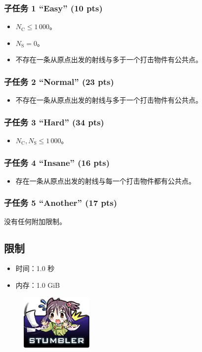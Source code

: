 \documentclass[UTF8, 11pt, a4paper]{article}
\begin{document}
\subsubsection*{子任务 1 “Easy” (10 pts)}
\begin{itemize}
    \item $N_\mathrm{C} \leq 1\,000$。
    \item $N_\mathrm{S} = 0$。
    \item 不存在一条从原点出发的射线与多于一个打击物件有公共点。
\end{itemize}
\subsubsection*{子任务 2 “Normal” (23 pts)}
\begin{itemize}
    \item 不存在一条从原点出发的射线与多于一个打击物件有公共点。
\end{itemize}
\subsubsection*{子任务 3 “Hard” (34 pts)}
\begin{itemize}
    \item $N_\mathrm{C}, N_\mathrm{S} \leq 1\,000$。
\end{itemize}
\subsubsection*{子任务 4 “Insane” (16 pts)}
\begin{itemize}
    \item 存在一条从原点出发的射线与每一个打击物件都有公共点。
\end{itemize}
\subsubsection*{子任务 5 “Another” (17 pts)}
    没有任何附加限制。

\subsection*{限制}
\begin{itemize}
\item 时间：1.0 秒
\item 内存：1.0 GiB
\end{itemize}

\begin{figure}[h]\centering
\includegraphics[scale=0.55]{stumbler.png}
\end{figure}
\end{document}
